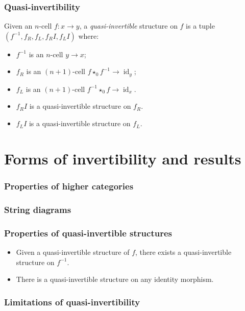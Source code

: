 \documentclass[presentation]{beamer}
\DeclareMathOperator{\id}{id}
\newcommand{\inv}[1]{#1^{-1}}
\newcommand{\comp}{\star}
\begin{document}
\begin{frame}
  \frametitle{Quasi-invertibility}
  \begin{definition}
    Given an \(n\)-cell \(f : x \to y\), a \emph{quasi-invertible} structure on \(f\) is a tuple \((\inv f, f_R, f_L, f_R{}I, f_L{}I)\) where:
    \begin{itemize}
    \item \(\inv f\) is an \(n\)-cell \(y \to x\);
    \item \(f_R\) is an \((n+1)\)-cell \(f \comp_0 \inv f \to \id_y\);
    \item \(f_L\) is an \((n+1)\)-cell \(\inv f \comp_0 f \to \id_x\).
    \item \(f_R{}I\) is a quasi-invertible structure on \(f_R\).
    \item \(f_L{}I\) is a quasi-invertible structure on \(f_L\).
    \end{itemize}
  \end{definition}
\end{frame}

\section{Forms of invertibility and results}

\begin{frame}
  \frametitle{Properties of higher categories}
\end{frame}

\begin{frame}
  \frametitle{String diagrams}
\end{frame}

\begin{frame}
  \frametitle{Properties of quasi-invertible structures}
  \begin{itemize}
  \item Given a quasi-invertible structure of \(f\), there exists a quasi-invertible structure on \(\inv f\).
  \item There is a quasi-invertible structure on any identity morphism.
  \end{itemize}
\end{frame}

\begin{frame}
  \frametitle{Limitations of quasi-invertibility}
\end{frame}
\end{document}
